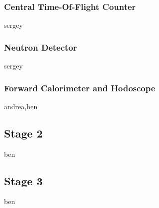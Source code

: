 \subsubsection{Central Time-Of-Flight Counter} sergey

\subsubsection{Neutron Detector} sergey

\subsubsection{Forward Calorimeter and Hodoscope} andrea,ben


\subsection{Stage 2} ben


\subsection{Stage 3} ben

